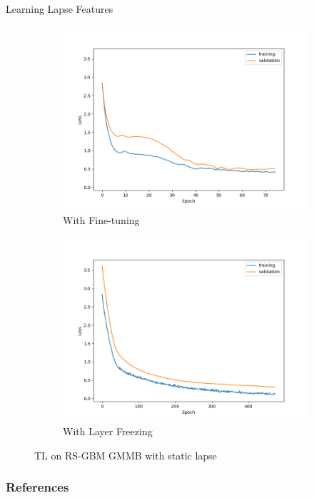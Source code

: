 \documentclass[9pt,handout]{beamer}
\begin{document}
\begin{frame}{Learning Lapse Features}
    \begin{figure}[ht!]
        \centering
        \begin{subfigure}{0.48\textwidth}
            \includegraphics[width=\textwidth]{../project3/figures/figure1c.png}
            \caption{With Fine-tuning}
        \end{subfigure}
        \begin{subfigure}{0.48\textwidth}
            \includegraphics[width=\textwidth]{../project3/figures/figure1d.png}
            \caption{With Layer Freezing}
        \end{subfigure}
        \caption{TL on RS-GBM GMMB with static lapse}
    \end{figure}

\end{frame}



\begin{frame}
    \frametitle{References}
    
    
\end{frame}
\end{document}
